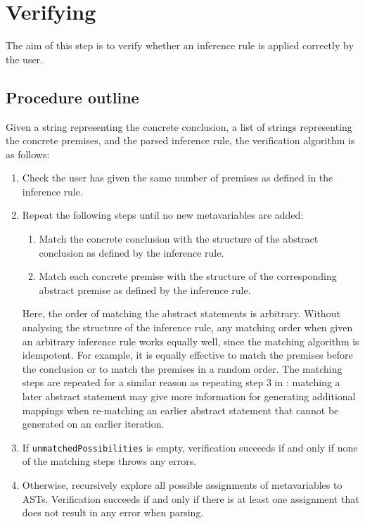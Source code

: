 \section{Verifying}
\label{checking:verifying}
The aim of this step is to verify whether an inference rule is applied correctly by the user.

\subsection{Procedure outline}
Given a string representing the concrete conclusion, a list of strings representing the concrete premises, and the parsed inference rule, the verification algorithm is as follows:
\begin{enumerate}
    \item Check the user has given the same number of premises as defined in the inference rule.
    \item Repeat the following steps until no new metavariables are added:
    \begin{enumerate}
        \item Match the concrete conclusion with the structure of the abstract conclusion as defined by the inference rule.
        \item Match each concrete premise with the structure of the corresponding abstract premise as defined by the inference rule.
    \end{enumerate}
    Here, the order of matching the abstract statements is arbitrary. Without analysing the structure of the inference rule, any matching order when given an arbitrary inference rule works equally well, since the matching algorithm is idempotent. For example, it is equally effective to match the premises before the conclusion or to match the premises in a random order. The matching steps are repeated for a similar reason as repeating step 3 in : matching a later abstract statement may give more information for generating additional mappings when re-matching an earlier abstract statement that cannot be generated on an earlier iteration.
    \item If \lstinline{unmatchedPossibilities} is empty, verification succeeds if and only if none of the matching steps throws any errors.
    \item Otherwise, recursively explore all possible assignments of metavariables to ASTs. Verification succeeds if and only if there is at least one assignment that does not result in any error when parsing.
\end{enumerate}